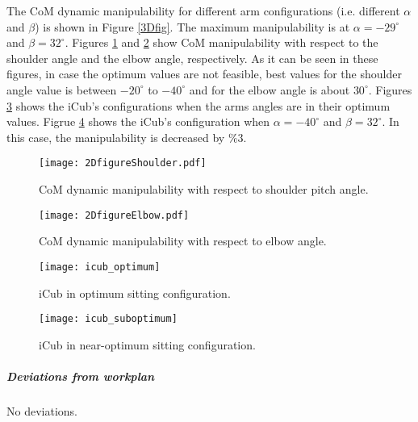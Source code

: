 The CoM dynamic manipulability for different arm configurations
(i.e. different $\alpha$ and $\beta$) is shown in Figure \ref{3Dfig}.  The
maximum manipulability is at $\alpha = -29^\circ$ and $\beta = 32^\circ$.
Figures \ref{2Dfig_shoulder} and \ref{2Dfig_elbow} show CoM manipulability
with respect to the shoulder angle and the elbow angle, respectively.  As it
can be seen in these figures, in case the optimum values are not feasible,
best values for the shoulder angle value is between $-20^\circ$ to $-40^\circ$
and for the elbow angle is about $30^\circ$.  Figures \ref{icub_optimum} shows
the iCub's configurations when the arms angles are in their optimum values.
Figrue \ref{icub_suboptimum} shows the iCub's configuration when $\alpha =
-40^\circ$ and $\beta = 32^\circ$.  In this case, the manipulability is
decreased by $\%3$.
%
\begin{figure}
  \centering \texttt{[image: 2DfigureShoulder.pdf]}
  \caption{CoM dynamic manipulability with respect to shoulder pitch angle.}
  \label{2Dfig_shoulder}
\end{figure}
%
\begin{figure}
  \centering
  \texttt{[image: 2DfigureElbow.pdf]}
  \caption{CoM dynamic manipulability with respect to elbow angle.}
  \label{2Dfig_elbow}
\end{figure}
%
\begin{figure}
  \centering \texttt{[image: icub\_optimum]}
  \caption{iCub in optimum sitting configuration.}
  \label{icub_optimum}
\end{figure}
%
\begin{figure}
  \centering
  \texttt{[image: icub\_suboptimum]}
  \caption{iCub in near-optimum sitting configuration.}
  \label{icub_suboptimum}
\end{figure}
%



\subparagraph{Deviations from workplan}  

No deviations.

